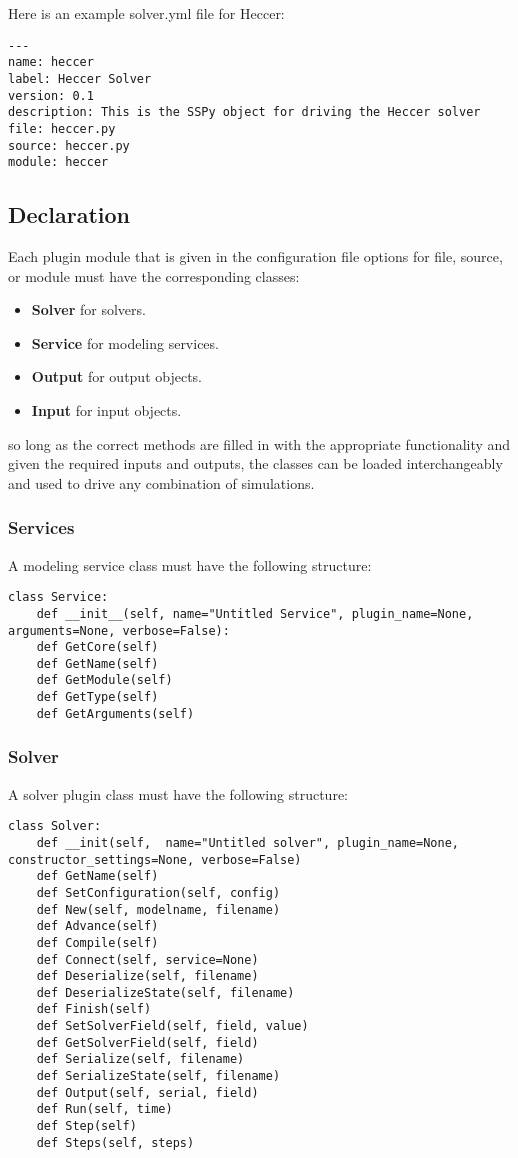 \documentclass[12pt]{article}
\begin{document}
Here is an example solver.yml file for Heccer:

\begin{verbatim}
---
name: heccer
label: Heccer Solver
version: 0.1
description: This is the SSPy object for driving the Heccer solver
file: heccer.py
source: heccer.py
module: heccer
\end{verbatim}


\subsection*{Declaration}

Each plugin module that is given in the configuration file options for file, source, or module must have the corresponding classes:

\begin{itemize}
	\item[] {\bf Solver} for solvers.
	\item[] {\bf Service} for modeling services.
	\item[] {\bf Output} for output objects.
	\item[] {\bf Input} for input objects.
\end{itemize}

so long as the correct methods are filled in with the appropriate functionality and given the required inputs and outputs,  the classes can be loaded interchangeably and used to drive any combination of simulations. 

\subsubsection*{Services}

A modeling service class must have the following structure:

\begin{verbatim}
class Service:
	def __init__(self, name="Untitled Service", plugin_name=None, arguments=None, verbose=False):
	def GetCore(self)
	def GetName(self)
	def GetModule(self)
	def GetType(self)
	def GetArguments(self)
\end{verbatim}

\subsubsection*{Solver}

A solver plugin class must have the following structure:

\begin{verbatim}
class Solver:
	def __init(self,  name="Untitled solver", plugin_name=None, constructor_settings=None, verbose=False)
	def GetName(self)
	def SetConfiguration(self, config)
	def New(self, modelname, filename)
	def Advance(self)
	def Compile(self)
	def Connect(self, service=None)
	def Deserialize(self, filename)
	def DeserializeState(self, filename)
	def Finish(self)
	def SetSolverField(self, field, value)
	def GetSolverField(self, field)
	def Serialize(self, filename)
	def SerializeState(self, filename)
	def Output(self, serial, field)
	def Run(self, time)
	def Step(self)
	def Steps(self, steps)
\end{verbatim}
\end{document}
